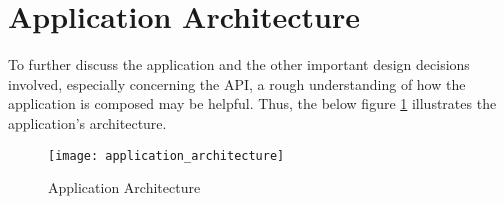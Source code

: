 \section{Application Architecture}
To further discuss the application and the other important design decisions involved, especially concerning the API, a rough understanding of how the application is composed may be helpful. Thus, the below figure \ref{fig:ApplicationArchitecture} illustrates the application's architecture. 

\begin{figure}[H]
	\centering
	\texttt{[image: application\_architecture]}
	\caption[Application Architecture]{Application Architecture }
	\label{fig:ApplicationArchitecture}
\end{figure}

